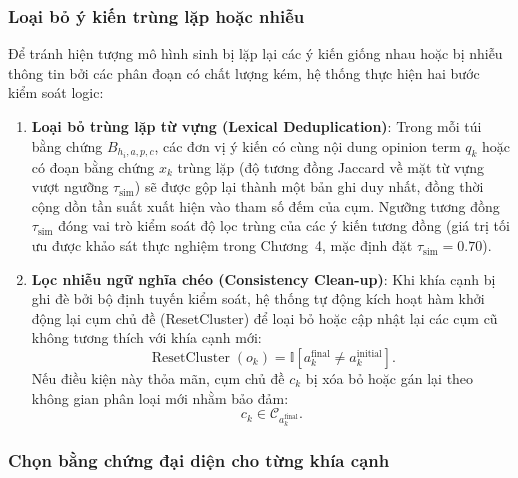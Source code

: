 \subsubsection{Loại bỏ ý kiến trùng lặp hoặc nhiễu}
\label{subsubsec:method1-deduplication-and-noise-removal}

Để tránh hiện tượng mô hình sinh bị lặp lại các ý kiến giống nhau hoặc bị nhiễu thông tin bởi các phân đoạn có chất lượng kém, hệ thống thực hiện hai bước kiểm soát logic:
\begin{enumerate}[leftmargin=1.2cm]
    \item \textbf{Loại bỏ trùng lặp từ vựng (Lexical Deduplication)}: Trong mỗi túi bằng chứng $B_{h_i,a,p,c}$, các đơn vị ý kiến có cùng nội dung opinion term $q_k$ hoặc có đoạn bằng chứng $x_k$ trùng lặp (độ tương đồng Jaccard về mặt từ vựng vượt ngưỡng $\tau_{\mathrm{sim}}$) sẽ được gộp lại thành một bản ghi duy nhất, đồng thời cộng dồn tần suất xuất hiện vào tham số đếm của cụm. Ngưỡng tương đồng $\tau_{\mathrm{sim}}$ đóng vai trò kiểm soát độ lọc trùng của các ý kiến tương đồng (giá trị tối ưu được khảo sát thực nghiệm trong Chương~4, mặc định đặt $\tau_{\mathrm{sim}} = 0.70$).
    \item \textbf{Lọc nhiễu ngữ nghĩa chéo (Consistency Clean-up)}: Khi khía cạnh bị ghi đè bởi bộ định tuyến kiểm soát, hệ thống tự động kích hoạt hàm khởi động lại cụm chủ đề (ResetCluster) để loại bỏ hoặc cập nhật lại các cụm cũ không tương thích với khía cạnh mới:
\begin{equation}
\operatorname{ResetCluster}(o_k) = \mathbb{I}\left[a_k^{\mathrm{final}} \neq a_k^{\mathrm{initial}}\right].
\label{eq:method1-cluster-reset}
\end{equation}
Nếu điều kiện này thỏa mãn, cụm chủ đề $c_k$ bị xóa bỏ hoặc gán lại theo không gian phân loại mới nhằm bảo đảm:
\begin{equation}
c_k \in \mathcal{C}_{a_k^{\mathrm{final}}}.
\label{eq:method1-cluster-aspect-consistency}
\end{equation}
\end{enumerate}

\subsubsection{Chọn bằng chứng đại diện cho từng khía cạnh}
\label{subsubsec:method1-representative-evidence}

